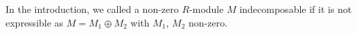 In the introduction, we called a non-zero $R$-module $M$ indecomposable if it
is not expressible as $M = M_1\oplus M_2$ with $M_1$, $M_2$ non-zero.
